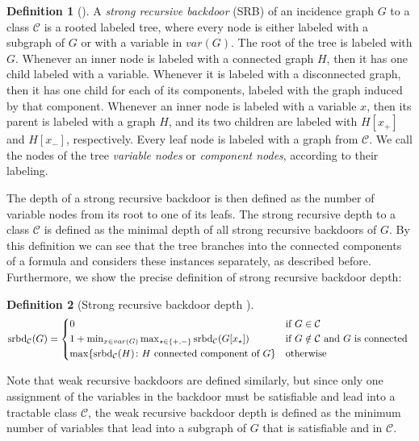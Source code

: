 \documentclass[11pt,a4paper]{article}
\theoremstyle{definition}
\newtheorem{definition}{Definition}[section]
\theoremstyle{proposition}
\begin{document}
\begin{definition}[{\cite[p.4]{maehlmann2021recursive}}]
A \emph{strong recursive backdoor} (SRB) of an incidence graph $G$ to a class $\mathcal{C}$ is a rooted labeled tree, where every node is either labeled with a subgraph of $G$ or with a variable in $var(G)$. The root of the tree is labeled with $G$. Whenever an inner node is labeled with a connected graph $H$, then it has one child labeled with a variable. Whenever it is labeled with a disconnected graph, then it has one child for each of its components, labeled with the graph induced by that component. Whenever an inner node is labeled with a variable $x$, then its parent is labeled with a graph $H$, and its two children are labeled with $H[x_+]$ and $H[x_-]$, respectively. Every leaf node is labeled with a graph from $\mathcal{C}$. We call the nodes of the tree \textit{variable nodes} or \textit{component nodes}, according to their labeling. 
\end{definition}
The depth of a strong recursive backdoor is then defined as the number of variable nodes from its root to one of its leafs. The strong recursive depth to a class $\mathcal{C}$ is defined as the minimal depth of all strong recursive backdoors of $G$. By this definition we can see that the tree branches into the connected components of a formula and considers these instances separately, as described before. Furthermore, we show the precise definition of strong recursive backdoor depth:
\begin{definition}[Strong recursive backdoor depth {\cite[Definition 3.1, p.5]{maehlmann2021recursive}}]

\begin{equation*}
    \text{srbd}_{\mathcal{C}}(G) = 
    \begin{cases*}
      0 & if $G \in \mathcal{C}$  \\
	1 + \min_{x \in var(G)} \max_{\star \in \{+,-\}} \text{srbd}_{\mathcal{C}}(G[x_{\star}]) & if $G \notin \mathcal{C}$ and $G$ is connected \\
      \max \{  \text{srbd}_{\mathcal{C}}(H) \colon H \text{ connected component of } G \}       & otherwise 
    \end{cases*}
  \end{equation*}
\end{definition}
Note that weak recursive backdoors are defined similarly, but since only one assignment of the variables in the backdoor must be satisfiable and lead into a tractable class $\mathcal{C}$, the weak recursive backdoor depth is defined as the minimum number of variables that lead into a subgraph of $G$ that is satisfiable and in $\mathcal{C}$.
\end{document}
